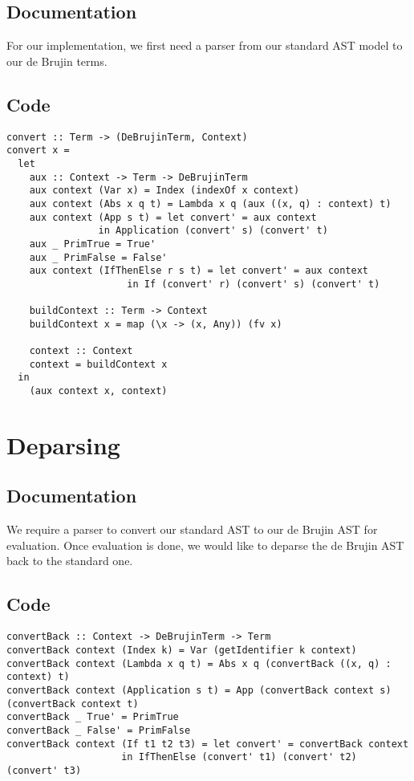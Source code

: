 \documentclass[11pt]{article}
\begin{document}
\subsection{Documentation}
\label{sec-4-1}
For our implementation, we first need a parser from our standard AST model to our de Brujin terms. 

\subsection{Code}
\label{sec-4-2}
\begin{verbatim}
convert :: Term -> (DeBrujinTerm, Context)
convert x =
  let
    aux :: Context -> Term -> DeBrujinTerm
    aux context (Var x) = Index (indexOf x context)
    aux context (Abs x q t) = Lambda x q (aux ((x, q) : context) t)
    aux context (App s t) = let convert' = aux context
			    in Application (convert' s) (convert' t)
    aux _ PrimTrue = True'
    aux _ PrimFalse = False'
    aux context (IfThenElse r s t) = let convert' = aux context
				     in If (convert' r) (convert' s) (convert' t)

    buildContext :: Term -> Context
    buildContext x = map (\x -> (x, Any)) (fv x)

    context :: Context
    context = buildContext x
  in
    (aux context x, context)
\end{verbatim}


\section{Deparsing}
\label{sec-5}
\subsection{Documentation}
\label{sec-5-1}
We require a parser to convert our standard AST to our de Brujin AST for evaluation. Once evaluation is done, we would like to deparse the de Brujin AST back to the standard one.

\subsection{Code}
\label{sec-5-2}
\begin{verbatim}
convertBack :: Context -> DeBrujinTerm -> Term
convertBack context (Index k) = Var (getIdentifier k context)
convertBack context (Lambda x q t) = Abs x q (convertBack ((x, q) : context) t)
convertBack context (Application s t) = App (convertBack context s) (convertBack context t)
convertBack _ True' = PrimTrue
convertBack _ False' = PrimFalse
convertBack context (If t1 t2 t3) = let convert' = convertBack context
				    in IfThenElse (convert' t1) (convert' t2) (convert' t3)
\end{verbatim}
\end{document}
